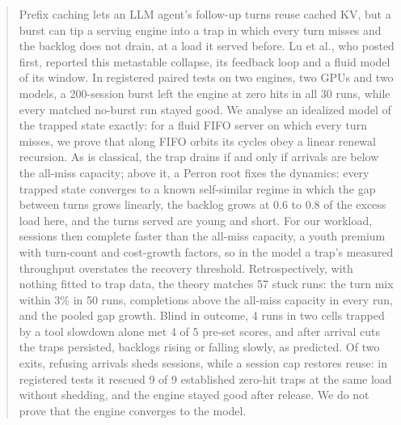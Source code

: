 \begin{abstract}
Prefix caching lets an LLM agent's follow-up turns reuse cached KV, but a burst can tip a serving engine into a trap in which every turn misses and the backlog does not drain, at a load it served before. Lu et al., who posted first, reported this metastable collapse, its feedback loop and a fluid model of its window. In registered paired tests on two engines, two GPUs and two models, a 200-session burst left the engine at zero hits in all 30 runs, while every matched no-burst run stayed good. We analyse an idealized model of the trapped state exactly: for a fluid FIFO server on which every turn misses, we prove that along FIFO orbits its cycles obey a linear renewal recursion. As is classical, the trap drains if and only if arrivals are below the all-miss capacity; above it, a Perron root fixes the dynamics: every trapped state converges to a known self-similar regime in which the gap between turns grows linearly, the backlog grows at 0.6 to 0.8 of the excess load here, and the turns served are young and short. For our workload, sessions then complete faster than the all-miss capacity, a youth premium with turn-count and cost-growth factors, so in the model a trap's measured throughput overstates the recovery threshold. Retrospectively, with nothing fitted to trap data, the theory matches 57 stuck runs: the turn mix within 3\% in 50 runs, completions above the all-miss capacity in every run, and the pooled gap growth. Blind in outcome, 4 runs in two cells trapped by a tool slowdown alone met 4 of 5 pre-set scores, and after arrival cuts the traps persisted, backlogs rising or falling slowly, as predicted. Of two exits, refusing arrivals sheds sessions, while a session cap restores reuse: in registered tests it rescued 9 of 9 established zero-hit traps at the same load without shedding, and the engine stayed good after release. We do not prove that the engine converges to the model.
\end{abstract}
